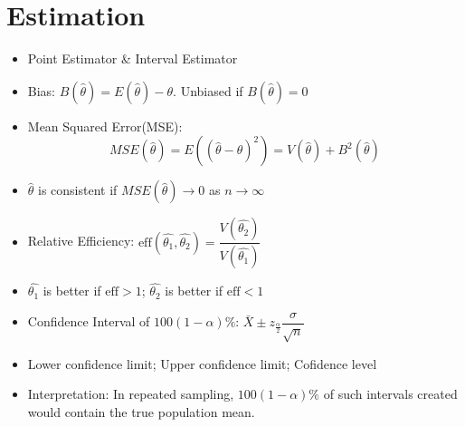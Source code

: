\documentclass[%
 aip,
 jmp,%
 amsmath,amssymb,
 reprint,%
]{revtex4-1}
\begin{document}
\section{Estimation}
\begin{itemize}[label={}]
\item Point Estimator \& Interval Estimator
\item Bias: $B(\hat{\theta})=E(\hat{\theta}) - \theta$. Unbiased if $B(\hat{\theta})=0$
\item Mean Squared Error(MSE): $$MSE(\hat{\theta})=E((\hat{\theta}-\theta)^2)=V(\hat{\theta})+B^2(\hat{\theta})$$
\item $\hat{\theta}$ is consistent if $MSE(\hat{\theta})\rightarrow 0$ as $n \rightarrow \infty$
\item Relative Efficiency: $\textrm{eff}(\hat{\theta_1}, \hat{\theta_2})=\dfrac{V(\hat{\theta_2})}{V(\hat{\theta_1})}$
\item $\hat{\theta_1}$ is better if $\textrm{eff}>1$; $\hat{\theta_2}$ is better if $\textrm{eff}<1$
\item Confidence Interval of $100(1-\alpha)\%$: $\bar{X} \pm z_{\frac{\alpha}{2}}\dfrac{\sigma}{\sqrt{n}}$
\item Lower confidence limit; Upper confidence limit; Cofidence level
\item Interpretation: In repeated sampling, $100(1-\alpha)\%$ of such intervals created would contain the true population mean.\\
\end{itemize}
\end{document}
